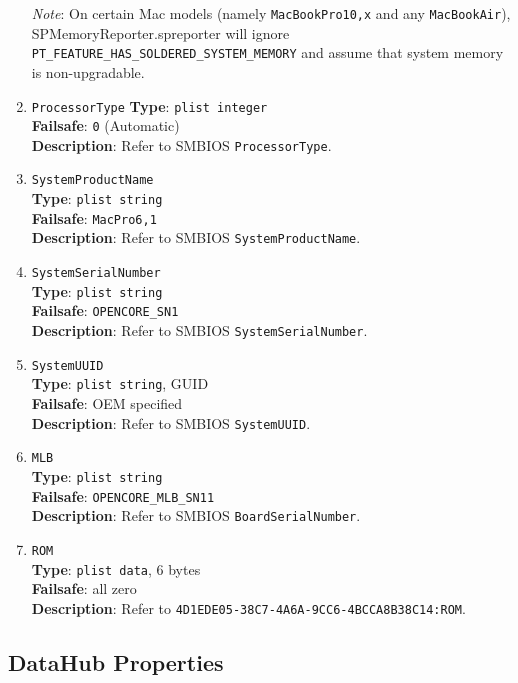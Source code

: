 \documentclass[]{article}
\begin{document}
\begin{enumerate}
  \emph{Note}: On certain Mac models (namely \texttt{MacBookPro10,x} and any \texttt{MacBookAir}),
  SPMemoryReporter.spreporter will ignore \texttt{PT\_FEATURE\_HAS\_SOLDERED\_SYSTEM\_MEMORY}
  and assume that system memory is non-upgradable.

\item
  \texttt{ProcessorType}
  \textbf{Type}: \texttt{plist\ integer}\\
  \textbf{Failsafe}: \texttt{0} (Automatic)\\
  \textbf{Description}: Refer to SMBIOS \texttt{ProcessorType}.
\item
  \texttt{SystemProductName}\\
  \textbf{Type}: \texttt{plist\ string}\\
  \textbf{Failsafe}: \texttt{MacPro6,1}\\
  \textbf{Description}: Refer to SMBIOS \texttt{SystemProductName}.
\item
  \texttt{SystemSerialNumber}\\
  \textbf{Type}: \texttt{plist\ string}\\
  \textbf{Failsafe}: \texttt{OPENCORE\_SN1}\\
  \textbf{Description}: Refer to SMBIOS \texttt{SystemSerialNumber}.
\item
  \texttt{SystemUUID}\\
  \textbf{Type}: \texttt{plist\ string}, GUID\\
  \textbf{Failsafe}: OEM specified\\
  \textbf{Description}: Refer to SMBIOS \texttt{SystemUUID}.
\item
  \texttt{MLB}\\
  \textbf{Type}: \texttt{plist\ string}\\
  \textbf{Failsafe}: \texttt{OPENCORE\_MLB\_SN11}\\
  \textbf{Description}: Refer to SMBIOS \texttt{BoardSerialNumber}.
\item
  \texttt{ROM}\\
  \textbf{Type}: \texttt{plist\ data}, 6 bytes\\
  \textbf{Failsafe}: all zero\\
  \textbf{Description}: Refer to
  \texttt{4D1EDE05-38C7-4A6A-9CC6-4BCCA8B38C14:ROM}.

\end{enumerate}

\subsection{DataHub Properties}\label{platforminfodatahub}
\end{document}

